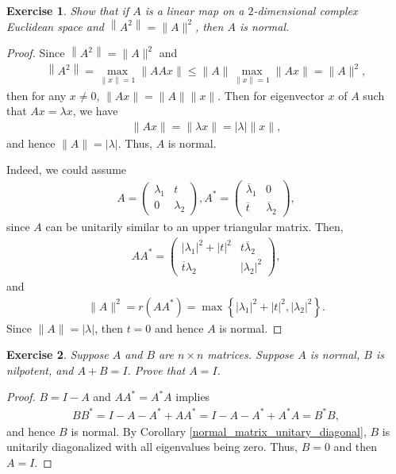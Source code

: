 \documentclass[11pt]{book}
\newtheorem{exercise}{Exercise}[section]
\theoremstyle{definition}
\numberwithin{equation}{chapter}
\begin{document}
\begin{exercise}
Show that if $A$ is a linear map on a $2$-dimensional complex Euclidean space and $\left\|A^2\right\| = \|A\|^2$, then $A$ is normal.
\end{exercise}
\begin{proof}
Since $\left\|A^2\right\| = \|A\|^2$ and
\begin{align*}
    \left\|A^2\right\| = \max_{\|x\| = 1} \|AAx\| \leq \|A\| \max_{\|x\| = 1} \|Ax\| = \|A\|^2,
\end{align*}
then for any $x \neq 0$, $\|Ax\| = \|A\| \|x\|$. Then for eigenvector $x$ of $A$ such that $Ax = \lambda x$, we have
\begin{align*}
    \|Ax\| = \|\lambda x\| = |\lambda| \|x\|,
\end{align*}
and hence $\|A\| = |\lambda|$. Thus, $A$ is normal.

Indeed, we could assume
\begin{align*}
    A = \begin{pmatrix}
        \lambda_1 & t \\
        0 & \lambda_2
    \end{pmatrix},
    A^* = \begin{pmatrix}
        \overline{\lambda}_1 & 0 \\
        \overline{t} & \overline{\lambda}_2
    \end{pmatrix},
\end{align*}
since $A$ can be unitarily similar to an upper triangular matrix. Then,
\begin{align*}
    A A^* = \begin{pmatrix}
        \left|\lambda_1\right|^2 + |t|^2 & t \overline{\lambda}_2 \\
        \overline{t} \lambda_2 & \left|\lambda_2\right|^2
    \end{pmatrix},
\end{align*}
and 
\begin{align*}
    \|A\|^2 = r\left(A A^*\right) = \max \left\{ \left|\lambda_1\right|^2 + |t|^2, \left|\lambda_2\right|^2 \right\}.
\end{align*}
Since $\|A\| = |\lambda|$, then $t = 0$ and hence $A$ is normal.
\end{proof}

\medskip

\begin{exercise}
Suppose $A$ and $B$ are $n \times n$ matrices. Suppose $A$ is normal, $B$ is nilpotent, and $A + B = I$. Prove that $A = I$.
\end{exercise}
\begin{proof}
$B = I - A$ and $A A^* = A^* A$ implies
\begin{align*}
    BB^* = I - A - A^* + A A^* = I - A - A^* + A^* A = B^*B,
\end{align*}
and hence $B$ is normal. By Corollary \ref{normal_matrix_unitary_diagonal}, $B$ is unitarily diagonalized with all eigenvalues being zero. Thus, $B = 0$ and then $A = I$.
\end{proof}
\end{document}
